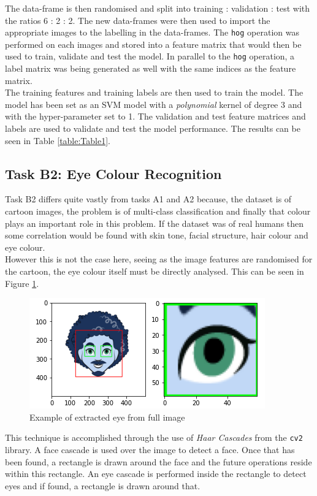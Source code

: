 \documentclass{article}
\begin{document}
    The data-frame is then randomised and split into training : validation : test with the ratios 6 : 2 : 2. The new data-frames were then used to import the appropriate images to the labelling in the data-frames. The \verb|hog| operation was performed on each images and stored into a feature matrix that would then be used to train, validate and test the model. In parallel to the \verb|hog| operation, a label matrix was being generated as well with the same indices as the feature matrix.\\
    
    The training features and training labels are then used to train the model. The model has been set as an SVM model with a \textit{polynomial} kernel of degree 3 and with the hyper-parameter set to 1. The validation and test feature matrices and labels are used to validate and test the model performance. The results can be seen in Table \ref{table:Table1}.
    \subsection{Task B2: Eye Colour Recognition}
    Task B2 differs quite vastly from tasks A1 and A2 because, the dataset is of cartoon images, the problem is of multi-class classification and finally that colour plays an important role in this problem. If the dataset was of real humans then some correlation would be found with skin tone, facial structure, hair colour and eye colour. \\
    
    However this is not the case here, seeing as the image features are randomised for the cartoon, the eye colour itself must be directly analysed. This can be seen in Figure \ref{fig:eye}.
    \begin{figure}[htb]
	\centering
	\includegraphics[scale=0.7]{Figures/Eye.PNG}
	\caption{Example of extracted eye from full image}
	\label{fig:eye}
\end{figure}     
	This technique is accomplished through the use of \textit{Haar Cascades} from the \verb|cv2| library. A face cascade is used over the image to detect a face. Once that has been found, a rectangle is drawn around the face and the future operations reside within this rectangle. An eye cascade is performed inside the rectangle to detect eyes and if found, a rectangle is drawn around that.\\
	
\end{document}
